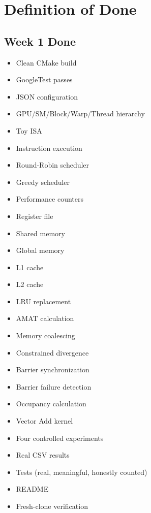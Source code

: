 \documentclass[11pt]{article}
\begin{document}
\section{Definition of Done}

\subsection{Week 1 Done}

\begin{itemize}[leftmargin=1.2cm]
  \item[$\square$] Clean CMake build
  \item[$\square$] GoogleTest passes
  \item[$\square$] JSON configuration
  \item[$\square$] GPU/SM/Block/Warp/Thread hierarchy
  \item[$\square$] Toy ISA
  \item[$\square$] Instruction execution
  \item[$\square$] Round-Robin scheduler
  \item[$\square$] Greedy scheduler
  \item[$\square$] Performance counters
  \item[$\square$] Register file
  \item[$\square$] Shared memory
  \item[$\square$] Global memory
  \item[$\square$] L1 cache
  \item[$\square$] L2 cache
  \item[$\square$] LRU replacement
  \item[$\square$] AMAT calculation
  \item[$\square$] Memory coalescing
  \item[$\square$] Constrained divergence
  \item[$\square$] Barrier synchronization
  \item[$\square$] Barrier failure detection
  \item[$\square$] Occupancy calculation
  \item[$\square$] Vector Add kernel
  \item[$\square$] Four controlled experiments
  \item[$\square$] Real CSV results
  \item[$\square$] Tests (real, meaningful, honestly counted)
  \item[$\square$] README
  \item[$\square$] Fresh-clone verification
\end{itemize}
\end{document}
